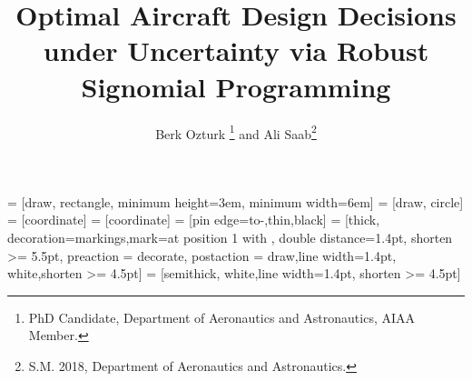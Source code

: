 \title{Optimal Aircraft Design Decisions under Uncertainty via Robust Signomial Programming}

\author{Berk Ozturk \footnote{PhD Candidate, Department of Aeronautics and Astronautics, AIAA Member.}
and Ali Saab\footnote{S.M. 2018, Department of Aeronautics and Astronautics.}}


\newcommand{\eqnref}[1]{(\ref{#1})}
\newcommand{\class}[1]{\texttt{#1}}
\newcommand{\package}[1]{\texttt{#1}}
\newcommand{\file}[1]{\texttt{#1}}
\newcommand{\BibTeX}{\textsc{Bib}\TeX}

\renewcommand{\vec}{\mathbf}
\newcommand{\mat}{\mathbf}

\usepackage[utf8]{inputenc}
\usepackage{bbm}
\usepackage{booktabs}
\usepackage{amsmath}
\usepackage{csvsimple}
\usepackage{filecontents}
\usepackage{float}
\usepackage[acronyms]{glossaries}
\usepackage[sort&compress, numbers]{natbib}
\usepackage{tabularx}
\usepackage[toc,page]{appendix}
\usepackage{tikz}
\usepackage{tkz-kiviat}
\usetikzlibrary{shapes, arrows, positioning, decorations.markings, fit}
\usepackage{pgfplotstable}
\usepackage{subcaption}
\usepackage{graphicx}
\makeglossaries

 = [draw, rectangle,
minimum height=3em, minimum width=6em]
 = [draw, circle]
 = [coordinate]
 = [coordinate]
 = [pin edge={to-,thin,black}]
 = [thick, decoration={markings,mark=at position
1 with {}},
double distance=1.4pt, shorten >= 5.5pt,
preaction = {decorate},
postaction = {draw,line width=1.4pt, white,shorten >= 4.5pt}]
 = [semithick, white,line width=1.4pt, shorten >= 4.5pt]

